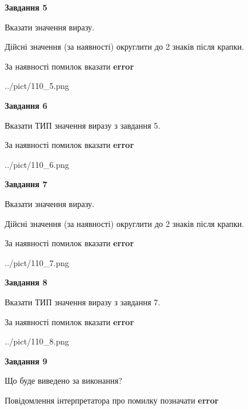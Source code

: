\documentclass[11pt, ukrainian]{article}
\begin{document}
{\begin {large}
{\begin {center}\textbf{Завдання 5}\end {center}}\par
Вказати значення виразу. \par
Дійсні значення (за наявності) округлити до 2 знаків після крапки. \par
За наявності помилок вказати \textbf{error}

\begin{center}
	{../pict/110_5.png}
\end{center}
\newpage

{\begin {center}\textbf{Завдання 6}\end {center}}\par
Вказати ТИП значення виразу з завдання 5. \par
За наявності помилок вказати \textbf{error}

\begin{center}
	{../pict/110_6.png}
\end{center}
\newpage

{\begin {center}\textbf{Завдання 7}\end {center}}\par
Вказати значення виразу. \par
Дійсні значення (за наявності) округлити до 2 знаків після крапки. \par
За наявності помилок вказати \textbf{error}

\begin{center}
	{../pict/110_7.png}
\end{center}
\newpage

{\begin {center}\textbf{Завдання 8}\end {center}}\par
Вказати ТИП значення виразу з завдання 7. \par
За наявності помилок вказати \textbf{error}

\begin{center}
	{../pict/110_8.png}
\end{center}
\newpage

{\begin {center}\textbf{Завдання 9}\end {center}}\par
Що буде виведено за виконання? \par
Повідомлення інтерпретатора про помилку позначати \textbf{error}


\end{large}}
\end{document}
